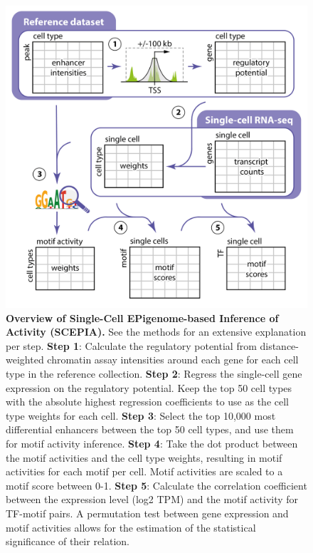 \begin{figure}
    \centering
    \includegraphics[width=0.95\linewidth]{ch.scepia/imgs/OverviewFigure_SvH_Myriad_v6_Figure2.png}
    \caption{\textbf{Overview of Single-Cell EPigenome-based Inference of Activity (SCEPIA).} See the methods for an extensive explanation per step. \newline 
    \textbf{Step 1}: Calculate the regulatory potential from distance-weighted chromatin assay intensities around each gene for each cell type in the reference collection.
    \textbf{Step 2}: Regress the single-cell gene expression on the regulatory potential. Keep the top 50 cell types with the absolute highest regression coefficients to use as the cell type weights for each cell.
    \textbf{Step 3}: Select the top 10,000 most differential enhancers between the top 50 cell types, and use them for motif activity inference.
    \textbf{Step 4}: Take the dot product between the motif activities and the cell type weights, resulting in motif activities for each motif per cell. Motif activities are scaled to a motif score between 0-1. 
    \textbf{Step 5}: Calculate the correlation coefficient between the expression level (log2 TPM) and the motif activity for TF-motif pairs. A permutation test between gene expression and motif activities allows for the estimation of the statistical significance of their relation.}
    \label{fig:scepia_overview}
\end{figure}

